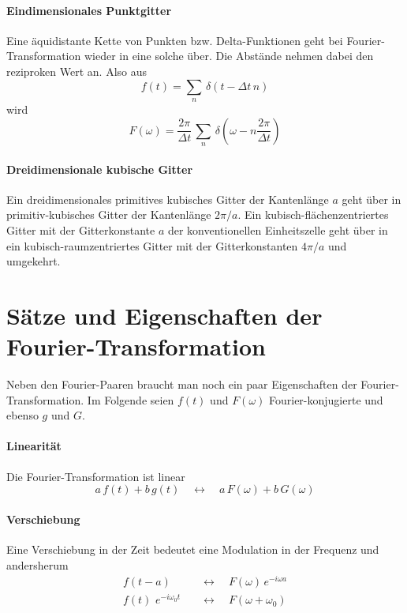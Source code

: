 \paragraph{Eindimensionales Punktgitter} Eine äquidistante Kette von Punkten bzw. Delta-Funktionen geht bei Fourier-Transformation wieder in eine solche über. Die Abstände nehmen dabei den reziproken Wert an. Also aus
\begin{equation}
 f(t) = \sum_n \, \delta (t - \Delta t \, n)
\end{equation}
wird
\begin{equation}
 F(\omega) = \frac{2 \pi}{\Delta t} \, \sum_n \, \delta \left(\omega - n\frac{2 \pi}{\Delta t} \right)
\end{equation}


\paragraph{Dreidimensionale kubische Gitter} Ein dreidimensionales primitives kubisches Gitter der Kantenlänge $a$ geht über in primitiv-kubisches Gitter der Kantenlänge $2 \pi/a$. Ein kubisch-flächenzentriertes Gitter mit der Gitterkonstante $a$ der konventionellen Einheitszelle geht über in ein kubisch-raumzentriertes Gitter mit der Gitterkonstanten $4 \pi / a$ und umgekehrt. 


\section{Sätze und Eigenschaften der Fourier-Transformation}

Neben den Fourier-Paaren braucht man noch ein paar Eigenschaften der Fourier-Transformation. Im Folgende seien  $f(t)$ und $F(\omega)$ Fourier-konjugierte  und ebenso $g$ und $G$.

\paragraph{Linearität} Die Fourier-Transformation ist linear
\begin{equation}
a \, f(t) + b \, g(t) \quad \leftrightarrow \quad 
a \, F(\omega) + b \, G(\omega) 
\end{equation}

\paragraph{Verschiebung}  Eine Verschiebung in der Zeit bedeutet eine Modulation in der Frequenz und andersherum
\begin{align}
 f(t - a) & \quad \leftrightarrow \quad 
F(\omega) \, e^{-i \omega a} \\
 f(t) \, \, e^{-i \omega_0 t} &  \quad \leftrightarrow \quad 
F(\omega + \omega_0)  
\end{align}

